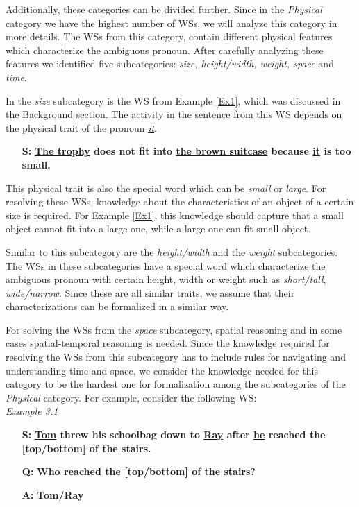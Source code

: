 Additionally, these categories can be divided further.
Since in the \textit{Physical} category we have the highest number of WSs, we will analyze this category in more details. The WSs from this category, contain different physical features which characterize the ambiguous pronoun. After carefully analyzing these features we identified five subcategories: \textit{size, height/width, weight, space} and \textit{time}. 

In the \textit{size} subcategory is the WS from Example \ref{Ex1}, which was discussed in the Background section. 
The activity in the sentence from this WS depends on the physical trait of the pronoun \textit{\underline{it}}.
\begin{itemize}
	\item[\textbf{S:}] \textbf{\underline{The trophy} does not fit into \underline{the brown suitcase} because \underline{it} is too small.}
\end{itemize}
This physical trait is also the special word which can be \textit{small} or \textit{large}. For resolving these WSs, knowledge about the characteristics of an object of a certain size is required. For Example \ref{Ex1}, this knowledge should capture that a small object cannot fit into a large one, while a large one can fit small object.

Similar to this subcategory are the \textit{height/width} and the \textit{weight} subcategories. The WSs in these subcategories have a special word which characterize the ambiguous pronoun with certain height, width or weight such as \textit{short/tall}, \textit{wide/narrow}. Since these are all similar traits, we assume that their characterizations can be formalized in a similar way.


For solving the WSs from the \textit{space} subcategory, spatial reasoning and in some cases spatial-temporal reasoning is needed. Since the knowledge required for resolving the WSs from this subcategory has to include rules for navigating and understanding time and space, we consider the knowledge needed for this category to be the hardest one for formalization among the subcategories of the \textit{Physical} category.
For example, consider the following WS:\\
\textit{Example 3.1} 
\begin{itemize} 
	\item[\textbf{S:}] \textbf{\underline{Tom} threw his schoolbag down to \underline{Ray} after \underline{he} reached the [top/bottom] of the stairs.}
	\item[\textbf{Q:}] \textbf{Who reached the [top/bottom] of the stairs?}
	\item[\textbf{A:}] \textbf{Tom/Ray}
\end{itemize}

